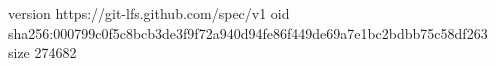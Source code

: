 version https://git-lfs.github.com/spec/v1
oid sha256:000799c0f5c8bcb3de3f9f72a940d94fe86f449de69a7e1bc2bdbb75c58df263
size 274682
